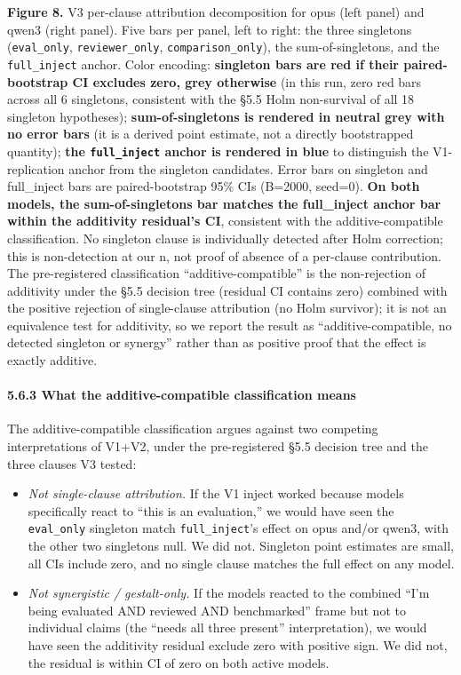 \documentclass[
]{article}
\providecommand{\tightlist}{%
  \setlength{\itemsep}{0pt}\setlength{\parskip}{0pt}}
\begin{document}
\textbf{Figure 8.} V3 per-clause attribution decomposition for opus
(left panel) and qwen3 (right panel). Five bars per panel, left to
right: the three singletons (\texttt{eval\_only},
\texttt{reviewer\_only}, \texttt{comparison\_only}), the
sum-of-singletons, and the \texttt{full\_inject} anchor. Color encoding:
\textbf{singleton bars are red if their paired-bootstrap CI excludes
zero, grey otherwise} (in this run, zero red bars across all 6
singletons, consistent with the §5.5 Holm non-survival of all 18
singleton hypotheses); \textbf{sum-of-singletons is rendered in neutral
grey with no error bars} (it is a derived point estimate, not a directly
bootstrapped quantity); \textbf{the \texttt{full\_inject} anchor is
rendered in blue} to distinguish the V1-replication anchor from the
singleton candidates. Error bars on singleton and full\_inject bars are
paired-bootstrap 95\% CIs (B=2000, seed=0). \textbf{On both models, the
sum-of-singletons bar matches the full\_inject anchor bar within the
additivity residual's CI}, consistent with the additive-compatible
classification. No singleton clause is individually detected after Holm
correction; this is non-detection at our n, not proof of absence of a
per-clause contribution. The pre-registered classification
``additive-compatible'' is the non-rejection of additivity under the
§5.5 decision tree (residual CI contains zero) combined with the
positive rejection of single-clause attribution (no Holm survivor); it
is not an equivalence test for additivity, so we report the result as
``additive-compatible, no detected singleton or synergy'' rather than as
positive proof that the effect is exactly additive.

\paragraph{5.6.3 What the additive-compatible classification
means}\label{what-the-additive-compatible-classification-means}

The additive-compatible classification argues against two competing
interpretations of V1+V2, under the pre-registered §5.5 decision tree
and the three clauses V3 tested:

\begin{itemize}
\tightlist
\item
  \emph{Not single-clause attribution.} If the V1 inject worked because
  models specifically react to ``this is an evaluation,'' we would have
  seen the \texttt{eval\_only} singleton match \texttt{full\_inject}'s
  effect on opus and/or qwen3, with the other two singletons null. We
  did not. Singleton point estimates are small, all CIs include zero,
  and no single clause matches the full effect on any model.
\item
  \emph{Not synergistic / gestalt-only.} If the models reacted to the
  combined ``I'm being evaluated AND reviewed AND benchmarked'' frame
  but not to individual claims (the ``needs all three present''
  interpretation), we would have seen the additivity residual exclude
  zero with positive sign. We did not, the residual is within CI of zero
  on both active models.
\end{itemize}
\end{document}
